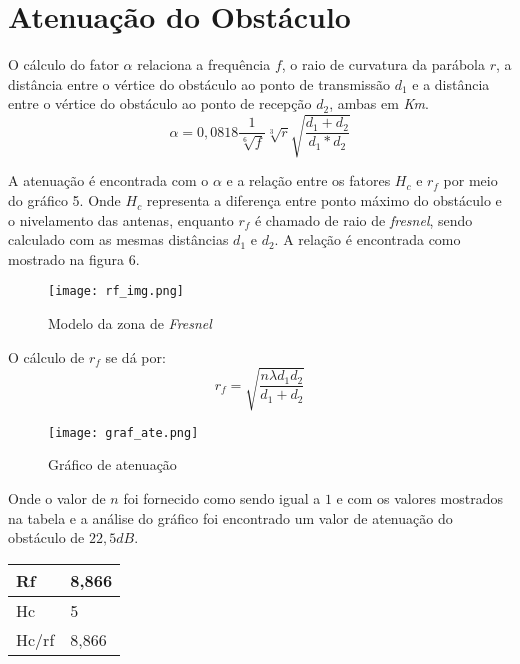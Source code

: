 \section{Atenuação do Obstáculo}
O cálculo do fator $\alpha$ relaciona a frequência $f$, o raio de curvatura da parábola $r$, a distância entre o vértice do obstáculo ao ponto de transmissão $d_1$ e a distância entre o vértice do obstáculo ao ponto de recepção $d_2$, ambas em \textit{Km}.
\begin{equation}
\alpha = 0,0818\dfrac{1}{\sqrt[6]{f}}\sqrt[3]{r}\sqrt{\dfrac{d_1+d_2}{d_1*d_2}}
\end{equation}

A atenuação é encontrada com o $\alpha$ e a relação entre os fatores  $H_c$ e $r_f$ por meio do gráfico 5. Onde $H_c$ representa a diferença entre ponto máximo do obstáculo e o nivelamento das antenas, enquanto $r_f$  é chamado de raio de \textit{fresnel}, sendo calculado com as mesmas distâncias $d_1$ e $d_2$. A relação é encontrada como mostrado na figura 6.

\begin{figure}[h]
	\centering
	\texttt{[image: rf\_img.png]}
	\label{fig:rf_img}
	\caption{Modelo da zona de \textit{Fresnel}}
\end{figure}

O cálculo de $r_f$ se dá por:
\begin{equation}
r_f = \sqrt{\dfrac{n\lambda d_1 d_2}{d_1 + d_2}}
\end{equation}

\begin{figure}[h]
	\centering
	\texttt{[image: graf\_ate.png]}
	\label{fig:graf_ate}
	\caption{Gráfico de atenuação}
\end{figure} 

Onde o valor de $n$ foi fornecido como sendo igual a $1$ e com os valores mostrados na tabela e a análise do gráfico foi encontrado um valor de atenuação do obstáculo de $22,5dB$.

\begin{center}
	\begin{table}[]
		\begin{tabular}{|l|l|}
			\hline
			Rf    & 8,866 \\ \hline
			Hc    & 5     \\ \hline
			Hc/rf & 8,866 \\ \hline
		\end{tabular}
	\end{table}
\end{center}



